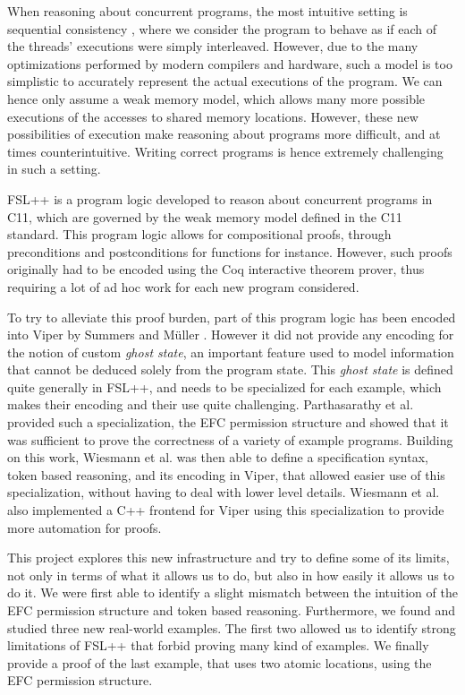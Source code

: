 When reasoning about concurrent programs, the most intuitive setting is sequential consistency \cite{LamportSC}, where we consider the program to behave as if each of the threads' executions were simply interleaved. However, due to the many optimizations performed by modern compilers and hardware, such a model is too simplistic to accurately represent the actual executions of the program. We can hence only assume a weak memory model, which allows many more possible executions of the accesses to shared memory locations. However, these new possibilities of execution make reasoning about programs more difficult, and at times counterintuitive. Writing correct programs is hence extremely challenging in such a setting.

FSL++ \cite{fsl} is a program logic developed to reason about concurrent programs in C11, which are governed by the weak memory model defined in the C11 standard. This program logic allows for compositional proofs, through preconditions and postconditions for functions for instance. However, such proofs originally had to be encoded using the Coq interactive theorem prover, thus requiring a lot of ad hoc work for each new program considered.


To try to alleviate this proof burden, part of this program logic has been encoded into Viper \cite{viper} by Summers and M\"uller \cite{rslViper}. However it did not provide any encoding for the notion of custom \emph{ghost state}, an important feature used to model information that cannot be deduced solely from the program state. This \emph{ghost state} is defined quite generally in FSL++, and needs to be specialized for each example, which makes their encoding and their use quite challenging. Parthasarathy et al. \cite{gaurav} provided such a specialization, the EFC permission structure and showed that it was sufficient to prove the correctness of a variety of example programs. Building on this work, Wiesmann et al. \cite{pascal} was then able to define a specification syntax, token based reasoning, and its encoding in Viper, that allowed easier use of this specialization, without having to deal with lower level details. Wiesmann et al. \cite{pascal} also implemented a C++ frontend for Viper using this specialization to provide more automation for proofs.  

This project explores this new infrastructure and try to define some of its limits, not only in terms of what it allows us to do, but also in how easily it allows us to do it. We were first able to identify a slight mismatch between the intuition of the EFC permission structure and token based reasoning. Furthermore, we found and studied three new real-world examples. The first two allowed us to identify strong limitations of FSL++ that forbid proving many kind of examples. We finally provide a proof of the last example, that uses two atomic locations, using the EFC permission structure. 

